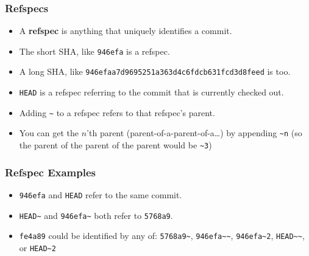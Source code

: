\documentclass{beamer}
\begin{document}
\newcommand{\squiggle}{\~{}}

\begin{frame}
  \frametitle{Refspecs}

  \begin{itemize}
  \item<2-> A \textbf{refspec} is anything that uniquely identifies a commit.
  \item<3-> The short SHA, like \texttt{946efa} is a refspec.
  \item<4-> A long SHA, like \texttt{946efaa7d9695251a363d4c6fdcb631fcd3d8feed} is too.
  \item<5-> \texttt{HEAD} is a refspec referring to the commit that is currently checked out.
  \item<6-> Adding \texttt{\squiggle} to a refspec refers to that refspec's parent.
  \item<7-> You can get the $n$'th parent (parent-of-a-parent-of-a\ldots) by appending \texttt{\squiggle n} (so the parent of the parent of the parent would be \texttt{\squiggle 3})
  \end{itemize}
\end{frame}

\begin{frame}
  \frametitle{Refspec Examples}

  \begin{center}
  \end{center}

  \begin{itemize}
  \item<3-> \texttt{946efa} and \texttt{HEAD} refer to the same commit.
  \item<4-> \texttt{HEAD\squiggle } and \texttt{946efa\squiggle } both refer to \texttt{5768a9}.
  \item<5-> \texttt{fe4a89} could be identified by any of: \texttt{5768a9\squiggle }, \texttt{946efa\squiggle \squiggle }, \texttt{946efa\squiggle 2}, \texttt{HEAD\squiggle \squiggle }, or \texttt{HEAD\squiggle 2}
  \end{itemize}
\end{frame}
\end{document}

